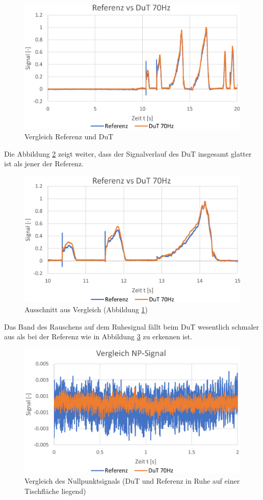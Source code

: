 	\begin{figure}[H]
		\centering
		\includegraphics[width=1\linewidth]{img_70Hz/comp_total}
		\caption{Vergleich Referenz und DuT}
		\label{fig:comptotal}
	\end{figure}
\noindent Die Abbildung \ref{fig:compdetail} zeigt weiter, dass der Signalverlauf des DuT insgesamt glatter ist als jener der Referenz.
	\begin{figure}[H]
		\centering
		\includegraphics[width=1\linewidth]{./img_70Hz/comp_detail}
		\caption{Ausschnitt aus Vergleich (Abbildung \ref{fig:comptotal})}
		\label{fig:compdetail}
	\end{figure}
\noindent Das Band des Rauschens auf dem Ruhesignal fällt beim DuT wesentlich schmaler aus als bei der Referenz wie in Abbildung \ref{fig:compnp} zu erkennen ist.
	\begin{figure}[H]
		\centering
		\includegraphics[width=1\linewidth]{img_70Hz/comp_NP}
		\caption{Vergleich des Nullpunktsignals (DuT und Referenz in Ruhe auf einer Tischfläche liegend)}
		\label{fig:compnp}
	\end{figure}
